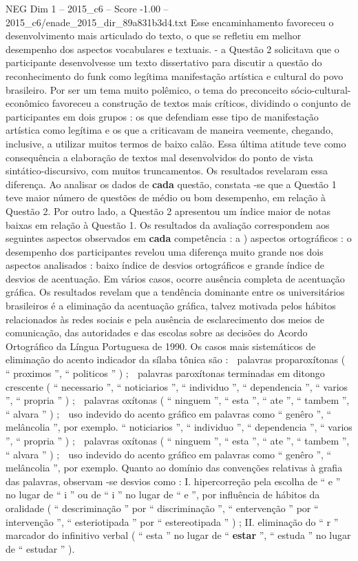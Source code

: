 \begin{textsample}{NEG Dim 1 – 2015\_c6 – Score -1.00 – 2015\_c6/enade\_2015\_dir\_89a831b3d4.txt}
Esse encaminhamento favoreceu o desenvolvimento mais articulado do texto, o que se refletiu em melhor desempenho dos aspectos vocabulares e textuais. - a Questão 2 solicitava que o participante desenvolvesse um texto dissertativo para discutir a questão do reconhecimento do funk como legítima manifestação artística e cultural do povo brasileiro.
Por ser um tema muito polêmico, o tema do preconceito sócio-cultural-econômico favoreceu a construção de textos mais críticos, dividindo o conjunto de participantes em dois grupos : os que defendiam esse tipo de manifestação artística como legítima e os que a criticavam de maneira veemente, chegando, inclusive, a utilizar muitos termos de baixo calão.
Essa última atitude teve como consequência a elaboração de textos mal desenvolvidos do ponto de vista sintático-discursivo, com muitos truncamentos.
Os resultados revelaram essa diferença.
Ao analisar os dados de \textbf{cada} questão, constata -se que a Questão 1 teve maior número de questões de médio ou bom desempenho, em relação à Questão 2.
Por outro lado, a Questão 2 apresentou um índice maior de notas baixas em relação à Questão 1.
Os resultados da avaliação correspondem aos seguintes aspectos observados em \textbf{cada} competência : a ) aspectos ortográficos : o desempenho dos participantes revelou uma diferença muito grande nos dois aspectos analisados : baixo índice de desvios ortográficos e grande índice de desvios de acentuação.
Em vários casos, ocorre ausência completa de acentuação gráfica.
Os resultados revelam que a tendência dominante entre os universitários brasileiros é a eliminação da acentuação gráfica, talvez motivada pelos hábitos relacionados às redes sociais e pela ausência de esclarecimento dos meios de comunicação, das autoridades e das escolas sobre as decisões do Acordo Ortográfico da Língua Portuguesa de 1990.
Os casos mais sistemáticos de eliminação do acento indicador da sílaba tônica são :  palavras proparoxítonas ( “ proximos ”, “ politicos ” ) ;  palavras paroxítonas terminadas em ditongo crescente ( “ necessario ”, “ noticiarios ”, “ individuo ”, “ dependencia ”, “ varios ”, “ propria ” ) ;  palavras oxítonas ( “ ninguem ”, “ esta ”, “ ate ”, “ tambem ”, “ alvara ” ) ;  uso indevido do acento gráfico em palavras como “ genêro ”, “ melâncolia ”, por exemplo. “ noticiarios ”, “ individuo ”, “ dependencia ”, “ varios ”, “ propria ” ) ;  palavras oxítonas ( “ ninguem ”, “ esta ”, “ ate ”, “ tambem ”, “ alvara ” ) ;  uso indevido do acento gráfico em palavras como “ genêro ”, “ melâncolia ”, por exemplo.
Quanto ao domínio das convenções relativas à grafia das palavras, observam -se desvios como : I. hipercorreção pela escolha de “ e ” no lugar de “ i ” ou de “ i ” no lugar de “ e ”, por influência de hábitos da oralidade ( “ descriminação ” por “ discriminação ”, “ entervenção ” por “ intervenção ”, “ esteriotipada ” por “ estereotipada ” ) ; II. eliminação do “ r ” marcador do infinitivo verbal ( “ esta ” no lugar de “ \textbf{estar} ”, “ estuda ” no lugar de “ estudar ” ).

\end{textsample}
